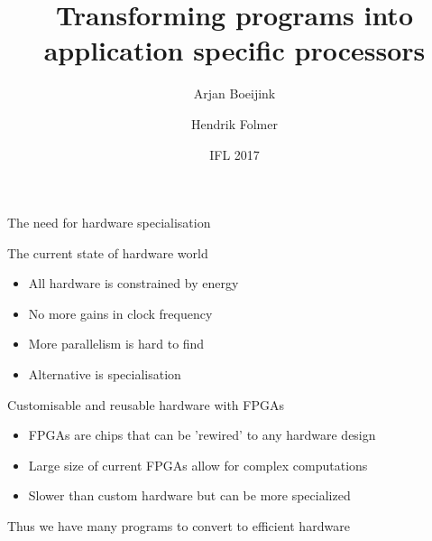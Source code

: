 \documentclass[pdf]{beamer}
\begin{document}
\title{Transforming programs into \\ application specific processors}
\author{Arjan Boeijink \and Hendrik Folmer}
\date{IFL 2017}

\frame{\titlepage}


\begin{frame}{The need for hardware specialisation}

\begin{block}{The current state of hardware world}
\begin{itemize}
\item All hardware is constrained by energy %
\item No more gains in clock frequency %
\item More parallelism is hard to find %
\item Alternative is specialisation %
\end{itemize}
\end{block}

\begin{block}{Customisable and reusable hardware with FPGAs}
\begin{itemize}
\item FPGAs are chips that can be 'rewired' to any hardware design
\item Large size of current FPGAs allow for complex computations
\item Slower than custom hardware but can be more specialized
\end{itemize}
\end{block}

\alert{Thus we have many programs to convert to efficient hardware}
\end{frame}
\end{document}
